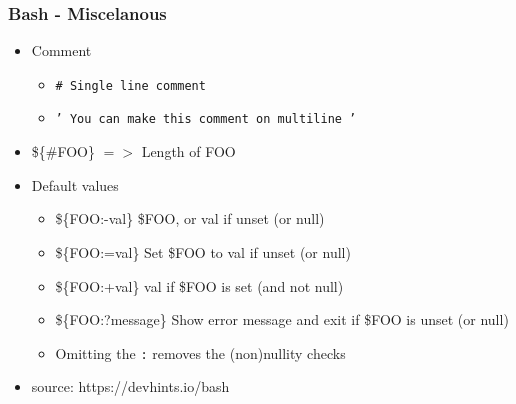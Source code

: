 \subsubsection{Bash - Miscelanous}
\begin{frame}[fragile]{\subsubsecname}
  \begin{itemize}
    \item Comment
    \begin{itemize}
      \item \texttt{\# Single line comment}
      \item \texttt{' You can make this comment on multiline '}
    \end{itemize}
    \item \$\{\#FOO\} $=>$ Length of FOO
    \item Default values
    \begin{itemize}
      \item \$\{FOO:-val\} \$FOO, or val if unset (or null)
      \item \$\{FOO:=val\} Set \$FOO to val if unset (or null)
      \item \$\{FOO:+val\} val if \$FOO is set (and not null)
      \item \$\{FOO:?message\} Show error message and exit if \$FOO is unset (or null)
      \item Omitting the \texttt{:} removes the (non)nullity checks
    \end{itemize}
    \item source: https://devhints.io/bash
  \end{itemize}
\end{frame}

